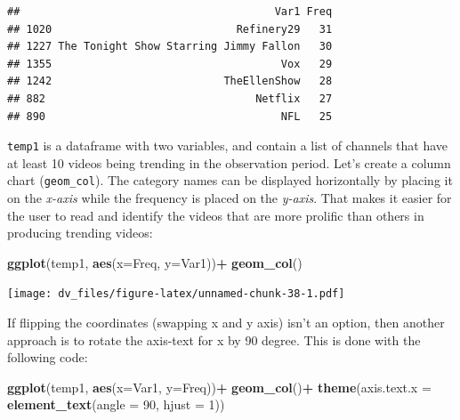 \documentclass[]{article}
\newenvironment{Shaded}{\begin{snugshade}}{\end{snugshade}}
\newcommand{\DataTypeTok}[1]{\textcolor[rgb]{0.13,0.29,0.53}{#1}}
\newcommand{\DecValTok}[1]{\textcolor[rgb]{0.00,0.00,0.81}{#1}}
\newcommand{\KeywordTok}[1]{\textcolor[rgb]{0.13,0.29,0.53}{\textbf{#1}}}
\newcommand{\NormalTok}[1]{#1}
\newcommand{\OperatorTok}[1]{\textcolor[rgb]{0.81,0.36,0.00}{\textbf{#1}}}
\newcommand{\StringTok}[1]{\textcolor[rgb]{0.31,0.60,0.02}{#1}}
\begin{document}
\begin{Shaded}
\end{Shaded}

\begin{verbatim}
##                                        Var1 Freq
## 1020                             Refinery29   31
## 1227 The Tonight Show Starring Jimmy Fallon   30
## 1355                                    Vox   29
## 1242                           TheEllenShow   28
## 882                                 Netflix   27
## 890                                     NFL   25
\end{verbatim}

\texttt{temp1} is a dataframe with two variables, and contain a list of
channels that have at least 10 videos being trending in the observation
period. Let's create a column chart (\texttt{geom\_col}). The category
names can be displayed horizontally by placing it on the \emph{x-axis}
while the frequency is placed on the \emph{y-axis}. That makes it easier
for the user to read and identify the videos that are more prolific than
others in producing trending videos:

\begin{Shaded}
\begin{Highlighting}[]
\KeywordTok{ggplot}\NormalTok{(temp1, }\KeywordTok{aes}\NormalTok{(}\DataTypeTok{x=}\NormalTok{Freq, }\DataTypeTok{y=}\NormalTok{Var1))}\OperatorTok{+}
\StringTok{  }\KeywordTok{geom_col}\NormalTok{()}
\end{Highlighting}
\end{Shaded}

\texttt{[image: dv\_files/figure-latex/unnamed-chunk-38-1.pdf]}

If flipping the coordinates (swapping x and y axis) isn't an option,
then another approach is to rotate the axis-text for x by 90 degree.
This is done with the following code:

\begin{Shaded}
\begin{Highlighting}[]
\KeywordTok{ggplot}\NormalTok{(temp1, }\KeywordTok{aes}\NormalTok{(}\DataTypeTok{x=}\NormalTok{Var1, }\DataTypeTok{y=}\NormalTok{Freq))}\OperatorTok{+}
\StringTok{  }\KeywordTok{geom_col}\NormalTok{()}\OperatorTok{+}
\StringTok{  }\KeywordTok{theme}\NormalTok{(}\DataTypeTok{axis.text.x =} \KeywordTok{element_text}\NormalTok{(}\DataTypeTok{angle =} \DecValTok{90}\NormalTok{, }\DataTypeTok{hjust =} \DecValTok{1}\NormalTok{))}
\end{Highlighting}
\end{Shaded}
\end{document}
